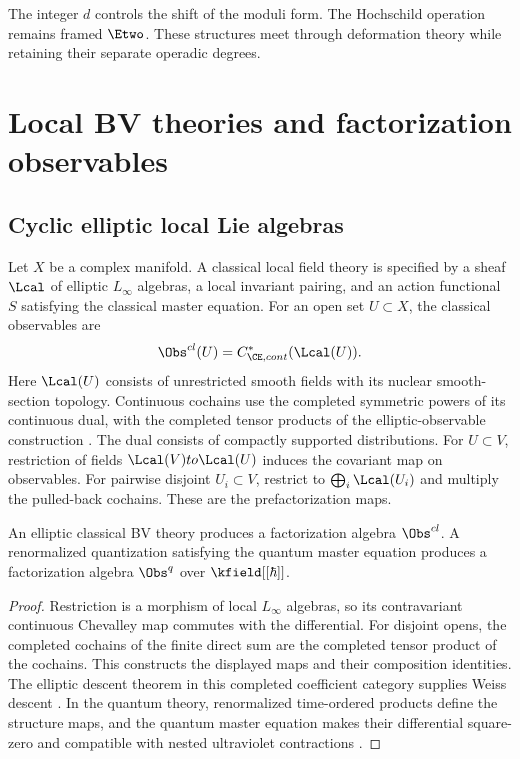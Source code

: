 The integer $d$ controls the shift of the moduli form. The Hochschild operation remains framed $\Etwo$. These structures meet through deformation theory while retaining their separate operadic degrees.

\chapter{Local BV theories and factorization observables}
\section{Cyclic elliptic local Lie algebras}
Let $X$ be a complex manifold. A classical local field theory is specified by a sheaf $\Lcal$ of elliptic $L_\infty$ algebras, a local invariant pairing, and an action functional $S$ satisfying the classical master equation. For an open set $U\subset X$, the classical observables are
\[
 \Obs^{\mathrm{cl}}(U)=C^*_{\CE,\mathrm{cont}}(\Lcal(U)).
\]
Here $\Lcal(U)$ consists of unrestricted smooth fields with its
nuclear smooth-section topology. Continuous cochains use the completed
symmetric powers of its continuous dual, with the completed tensor
products of the elliptic-observable construction \cite{CG1,CG2}.
The dual consists of compactly supported distributions.
For $U\subset V$, restriction of fields $\Lcal(V)\to\Lcal(U)$
induces the covariant map on observables.
For pairwise disjoint $U_i\subset V$, restrict to
$\bigoplus_i\Lcal(U_i)$ and multiply the pulled-back cochains.
These are the prefactorization maps.

\begin{theorem}
An elliptic classical BV theory produces a factorization algebra $\Obs^{\mathrm{cl}}$. A renormalized quantization satisfying the quantum master equation produces a factorization algebra $\Obs^{\mathrm{q}}$ over $\kfield[[\hbar]]$.
\end{theorem}
\begin{proof}
Restriction is a morphism of local $L_\infty$ algebras, so its
contravariant continuous Chevalley map commutes with the differential.
For disjoint opens, the completed cochains of the finite direct sum
are the completed tensor product of the cochains. This constructs
the displayed maps and their composition identities.
The elliptic descent theorem in this completed coefficient category
supplies Weiss descent \cite{CG1,CG2}. In the quantum theory, renormalized time-ordered products define the structure maps, and the quantum master equation makes their differential square-zero and compatible with nested ultraviolet contractions \cite{CG1,CG2}.
\end{proof}

